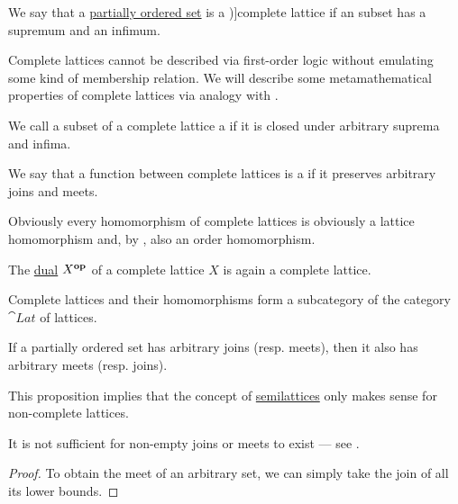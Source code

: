 \begin{definition}\label{def:complete_lattice}
  We say that a \hyperref[def:partially_ordered_set]{partially ordered set} is a \term[ru=полная (решётка) (\cite[133]{Гуров2013})]{complete lattice} if an  subset has a supremum and an infimum.

  Complete lattices cannot be described via first-order logic without emulating some kind of membership relation. We will describe some metamathematical properties of complete lattices via analogy with .
  \begin{thmenum}
     We call a subset of a complete lattice a  if it is closed under arbitrary suprema and infima.

    \mimprovised We say that a function between complete lattices is a  if it preserves arbitrary joins and meets.

    Obviously every homomorphism of complete lattices is obviously a lattice homomorphism and, by , also an order homomorphism.

     The \hyperref[def:preordered_set/opposite]{dual} \( X^\oppos \) of a complete lattice \( X \) is again a complete lattice.

     Complete lattices and their homomorphisms form a subcategory of the category \( \cat{Lat} \) of lattices.
  \end{thmenum}
\end{definition}

\begin{proposition}\label{thm:complete_semilattice}
  If a partially ordered set has arbitrary joins (resp. meets), then it also has arbitrary meets (resp. joins).
\end{proposition}
\begin{comments}
  \item This proposition implies that the concept of \hyperref[def:semilattice]{semilattices} only makes sense for non-complete lattices.

  \item It is not sufficient for non-empty joins or meets to exist --- see .
\end{comments}
\begin{proof}
  To obtain the meet of an arbitrary set, we can simply take the join of all its lower bounds.
\end{proof}

